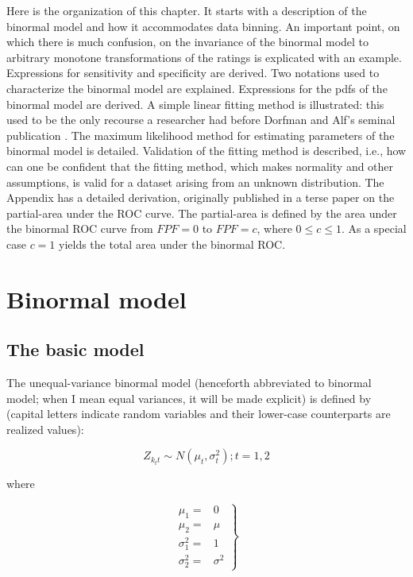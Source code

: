 \documentclass[
]{book}
\begin{document}
Here is the organization of this chapter. It starts with a description of the binormal model and how it accommodates data binning. An important point, on which there is much confusion, on the invariance of the binormal model to arbitrary monotone transformations of the ratings is explicated with an example. Expressions for sensitivity and specificity are derived. Two notations used to characterize the binormal model are explained. Expressions for the pdfs of the binormal model are derived. A simple linear fitting method is illustrated: this used to be the only recourse a researcher had before Dorfman and Alf's seminal publication \citep{RN1081}. The maximum likelihood method for estimating parameters of the binormal model is detailed. Validation of the fitting method is described, i.e., how can one be confident that the fitting method, which makes normality and other assumptions, is valid for a dataset arising from an unknown distribution. The Appendix has a detailed derivation, originally published in a terse paper \citep{thompson1989statistical} on the partial-area under the ROC curve. The partial-area is defined by the area under the binormal ROC curve from \(FPF = 0\) to \(FPF = c\), where \(0 \leq c \leq 1\). As a special case \(c = 1\) yields the total area under the binormal ROC.

\hypertarget{binormal-model-definition}{%
\section{Binormal model}\label{binormal-model-definition}}

\hypertarget{the-basic-model}{%
\subsection{The basic model}\label{the-basic-model}}

The unequal-variance binormal model (henceforth abbreviated to binormal model; when I mean equal variances, it will be made explicit) is defined by (capital letters indicate random variables and their lower-case counterparts are realized values):

\begin{equation} 
Z_{k_tt}\sim N\left ( \mu_t,\sigma_{t}^{2} \right );t=1,2
\label{eq:binormal-model-z-samples-1}
\end{equation}

where

\begin{equation} 
\left.
\begin{aligned}
\mu_1=&0\\
\mu_2=&\mu\\
\sigma_{1}^{2}=&1\\
\sigma_{2}^{2}=&\sigma^{2}
\end{aligned}
\right \}
\label{eq:binormal-model-z-samples-2}
\end{equation}
\end{document}
